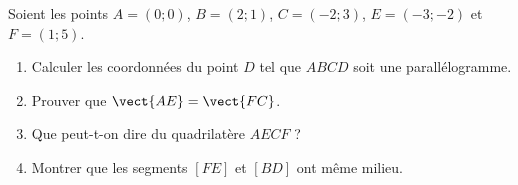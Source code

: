 
\begin{exercice}\label{exosmath-0064}

    Soient les points \( A=(0;0)\), \( B=(2;1)\), \( C=(-2;3)\), \( E=(-3;-2)\) et \( F=(1;5)\).
    \begin{enumerate}
        \item
            Calculer les coordonnées du point \( D\) tel que \( ABCD\) soit une parallélogramme.
        \item
            Prouver que \( \vect{ AE }=\vect{ FC }\).
        \item
            Que peut-t-on dire du quadrilatère \( AECF\) ?
        \item
            Montrer que les segments \( [FE]\) et \( [BD]\) ont même milieu.
    \end{enumerate}

\end{exercice}
